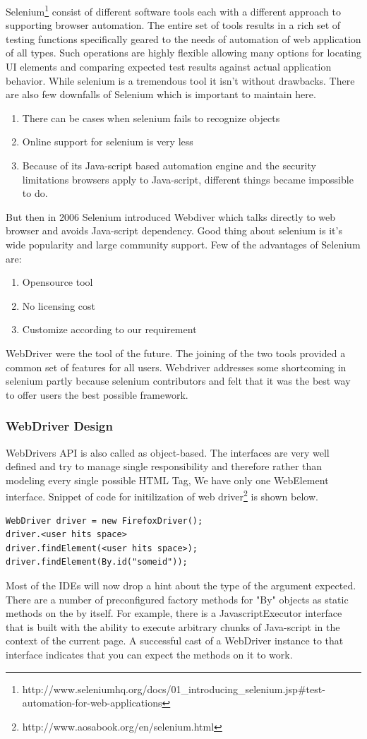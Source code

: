 \documentclass[article,type=msc,colorback,accentcolor=tud9c,twoside,11pt]{tudthesis}
\begin{document}
Selenium\footnote{http://www.seleniumhq.org/docs/01\_introducing\_selenium.jsp\#test-automation-for-web-applications} consist of different software tools each with a different approach to supporting browser automation. The entire set of tools results in a rich set of testing functions specifically geared to the needs of automation of web application of all types. Such operations are highly flexible allowing many options for locating UI elements and comparing expected test results against actual application behavior. While selenium is a tremendous tool it isn't without drawbacks.
There are also few downfalls of Selenium which is important to maintain here.
\begin{enumerate}
	\item	There can be cases when selenium fails to recognize objects
	\item Online support for selenium is very less
	\item Because of its Java-script based automation engine and the security limitations browsers apply to Java-script, different things became impossible to do.
\end{enumerate}
 But then in 2006 Selenium introduced Webdiver which talks directly to web browser and avoids Java-script dependency. Good thing about selenium is it's wide popularity and large community support. Few of the advantages of Selenium are:
 \begin{enumerate}
 	\item Opensource tool
 	\item No licensing cost
 	\item Customize according to our requirement
 \end{enumerate}
  WebDriver were the tool of the future. The joining of the two tools provided a common set of features for all users. Webdriver addresses some shortcoming in selenium partly because selenium contributors and felt that it was the best way to offer users the best possible framework.
\subsubsection{WebDriver Design}
WebDrivers API \cite{SeleniumTestingFramework} is also called as  object-based. The interfaces are very well defined and try to manage single responsibility and therefore rather than modeling every single possible HTML Tag, We have only one WebElement interface. Snippet of code for initilization of web driver\footnote{http://www.aosabook.org/en/selenium.html} is shown below.
\begin{lstlisting}
WebDriver driver = new FirefoxDriver();
driver.<user hits space>
driver.findElement(<user hits space>);
driver.findElement(By.id("someid"));
\end{lstlisting}
Most of the IDEs will now drop a hint about the type of the argument expected. There are a number of preconfigured factory methods for "By" objects as static methods on the by itself. For example, there is a JavascriptExecutor interface that is built with the ability to execute arbitrary chunks of Java-script in the context of the current page. A successful cast of a WebDriver instance to that interface indicates that you can expect the methods on it to work.
\end{document}
